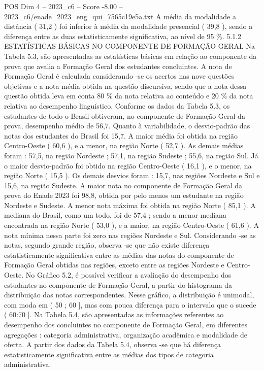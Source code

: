 \begin{textsample}{POS Dim 4 – 2023\_c6 – Score -8.00 – 2023\_c6/enade\_2023\_eng\_qui\_7565c19e5a.txt}
A média da modalidade a distância ( 31,2 ) foi inferior à média da modalidade presencial ( 39,8 ), sendo a diferença entre as duas estatisticamente significativa, ao nível de 95 \%. 5.1.2 ESTATÍSTICAS BÁSICAS NO COMPONENTE DE FORMAÇÃO GERAL Na Tabela 5.3, são apresentadas as estatísticas básicas em relação ao componente da prova que avalia a Formação Geral dos estudantes concluintes.
A nota de Formação Geral é calculada considerando -se os acertos nas nove questões objetivas e a nota média obtida na questão discursiva, sendo que a nota dessa questão obtida leva em conta 80 \% da nota relativa ao conteúdo e 20 \% da nota relativa ao desempenho linguístico.
Conforme os dados da Tabela 5.3, os estudantes de todo o Brasil obtiveram, no componente de Formação Geral da prova, desempenho médio de 56,7.
Quanto à variabilidade, o desvio-padrão das notas dos estudantes do Brasil foi 15,7.
A maior média foi obtida na região Centro-Oeste ( 60,6 ), e a menor, na região Norte ( 52,7 ).
As demais médias foram : 57,5, na região Nordeste ; 57,1, na região Sudeste ; 55,6, na região Sul.
Já o maior desvio-padrão foi obtido na região Centro-Oeste ( 16,1 ), e o menor, na região Norte ( 15,5 ).
Os demais desvios foram : 15,7, nas regiões Nordeste e Sul e 15,6, na região Sudeste.
A maior nota no componente de Formação Geral da prova do Enade 2023 foi 98,8, obtida por pelo menos um estudante na região Nordeste e Sudeste.
A menor nota máxima foi obtida na região Norte ( 85,1 ).
A mediana do Brasil, como um todo, foi de 57,4 ; sendo a menor mediana encontrada na região Norte ( 53,0 ), e a maior, na região Centro-Oeste ( 61,6 ).
A nota mínima nessa parte foi zero nas regiões Nordeste e Sul.
Considerando -se as notas, segundo grande região, observa -se que não existe diferença estatisticamente significativa entre as médias das notas do componente de Formação Geral obtidas nas regiões, exceto entre as regiões Nordeste e Centro-Oeste.
No Gráfico 5.2, é possível verificar a avaliação do desempenho dos estudantes no componente de Formação Geral, a partir do histograma da distribuição das notas correspondentes.
Nesse gráfico, a distribuição é unimodal, com moda em ( 50 ; 60 ], mas com pouca diferença para o intervalo que o sucede ( 60:70 ].
Na Tabela 5.4, são apresentadas as informações referentes ao desempenho dos concluintes no componente de Formação Geral, em diferentes agregações : categoria administrativa, organização acadêmica e modalidade de oferta.
A partir dos dados da Tabela 5.4, observa -se que há diferença estatisticamente significativa entre as médias dos tipos de categoria administrativa.

\end{textsample}
